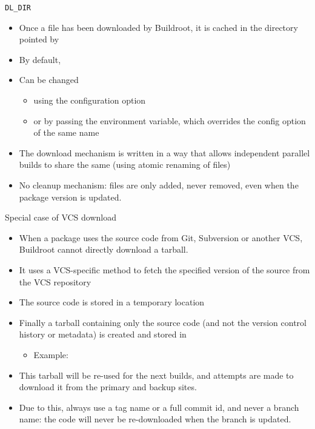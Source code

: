 \begin{frame}{{\tt DL\_DIR}}
  \begin{itemize}
  \item Once a file has been downloaded by Buildroot, it is cached in
    the directory pointed by 
  \item By default, 
  \item Can be changed
    \begin{itemize}
    \item using the  configuration option
    \item or by passing the  environment variable,
      which overrides the config option of the same name
    \end{itemize}
  \item The download mechanism is written in a way that allows
    independent parallel builds to share the same  (using
    atomic renaming of files)
  \item No cleanup mechanism: files are only added, never removed,
    even when the package version is updated.
  \end{itemize}
\end{frame}

\begin{frame}{Special case of VCS download}
  \begin{itemize}
  \item When a package uses the source code from Git, Subversion or
    another VCS, Buildroot cannot directly download a tarball.
  \item It uses a VCS-specific method to fetch the specified version
    of the source from the VCS repository
  \item The source code is stored in a temporary location
  \item Finally a tarball containing only the source code (and not the
    version control history or metadata) is created and stored in
    \begin{itemize}
    \item Example: 
    \end{itemize}
  \item This tarball will be re-used for the next builds, and attempts
    are made to download it from the primary and backup sites.
  \item Due to this, always use a tag name or a full commit id, and
    never a branch name: the code will never be re-downloaded when the
    branch is updated.
  \end{itemize}
\end{frame}

